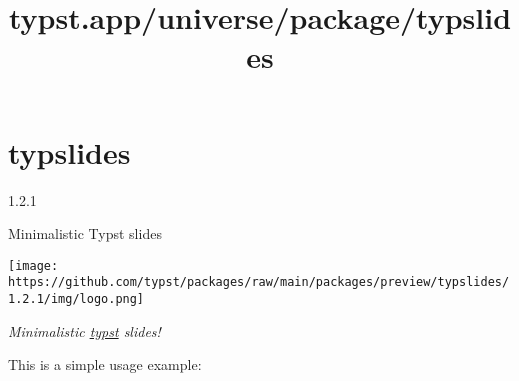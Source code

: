 \title{typst.app/universe/package/typslides}

\label{banner}
\section{typslides}\label{typslides}

{ 1.2.1 }

Minimalistic Typst slides

\label{readme}
\texttt{[image: https://github.com/typst/packages/raw/main/packages/preview/typslides/1.2.1/img/logo.png]}

\href{https://github.com/typst/packages/raw/main/packages/preview/typslides/1.2.1/}{}
\href{https://github.com/typst/packages/raw/main/packages/preview/typslides/1.2.1/}{}

\emph{Minimalistic \href{https://typst.app/}{typst} slides!}

This is a simple usage example:

